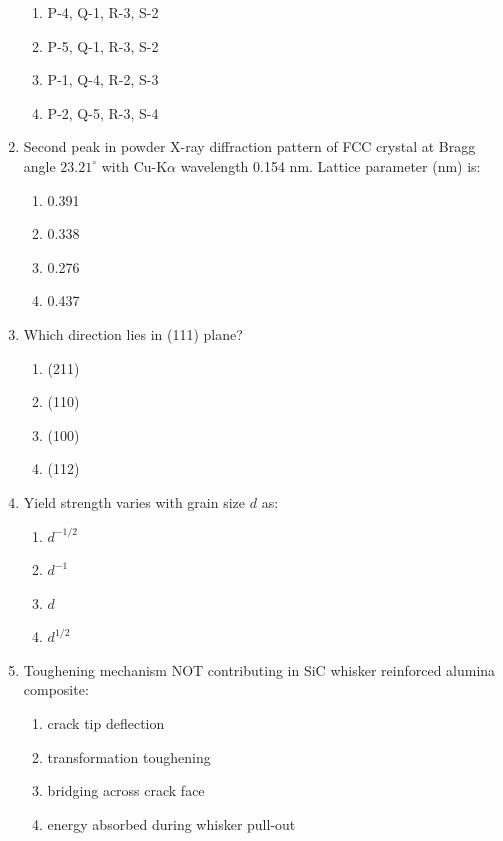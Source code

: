 \documentclass[journal,cmex10]{IEEEtran}
\theoremstyle{remark}
\numberwithin{equation}{enumi}
\numberwithin{figure}{enumi}
\begin{document}
\begin{enumerate}[label=\arabic*)]
\begin{enumerate}[label=\alph*)]
    \item P-4, Q-1, R-3, S-2
    \item P-5, Q-1, R-3, S-2
    \item P-1, Q-4, R-2, S-3
    \item P-2, Q-5, R-3, S-4
\end{enumerate}

\vspace{0.5cm}
\item Second peak in powder X-ray diffraction pattern of FCC crystal at Bragg angle $23.21^\circ$ with Cu-K$\alpha$ wavelength 0.154 nm. Lattice parameter (nm) is:
\vspace{0.3cm}
\hfill{}

\begin{enumerate}[label=\alph*)]
    \item 0.391
    \item 0.338
    \item 0.276
    \item 0.437
\end{enumerate}

\vspace{0.5cm}
\item  Which direction lies in (111) plane?  
\hfill{}

\begin{enumerate}[label=\alph*)]
    \item (211)
    \item (110)
    \item (100)
    \item (112)
\end{enumerate}

\vspace{0.5cm}
\item Yield strength varies with grain size $d$ as:  
\hfill{}
\begin{enumerate}[label=\alph*)]
    \item $d^{-1/2}$
    \item $d^{-1}$
    \item $d$
    \item $d^{1/2}$
\end{enumerate}

\vspace{0.5cm}
\item  Toughening mechanism NOT contributing in SiC whisker reinforced alumina composite:  
\hfill{}
\begin{enumerate}[label=\alph*)]
    \item crack tip deflection
    \item transformation toughening
    \item bridging across crack face
    \item energy absorbed during whisker pull-out
\end{enumerate}


\end{enumerate}
\end{document}
